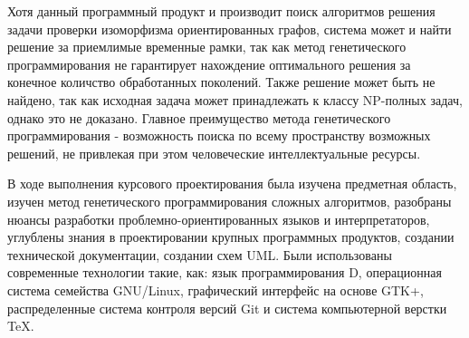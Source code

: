 \documentclass[russian,utf8,emptystyle]{eskdtext}
\begin{document}
\begin{spacing}{1.5}
Хотя данный программный продукт и производит поиск алгоритмов решения задачи проверки изоморфизма ориентированных графов, система может и найти решение за приемлимые временные рамки, так как метод генетического программирования не гарантирует нахождение оптимального решения за конечное количство обработанных поколений. Также решение может быть не найдено, так как исходная задача может принадлежать к классу NP-полных задач, однако это не доказано. Главное преимущество метода генетического программирования - возможность поиска по всему пространству возможных решений, не привлекая при этом человеческие интеллектуальные ресурсы.

В ходе выполнения курсового проектирования была изучена предметная область, изучен метод генетического программирования сложных алгоритмов, разобраны нюансы разработки проблемно-ориентированных языков и интерпретаторов, углублены знания в проектировании крупных программных продуктов, создании технической документации, создании схем UML. Были использованы современные технологии такие, как: язык программирования D, операционная система семейства GNU/Linux, графический интерфейс на основе GTK+, распределенные система контроля версий Git и система компьютерной верстки \TeX.

\newpage

\end{spacing}

\newpage
{}









\end{document}
